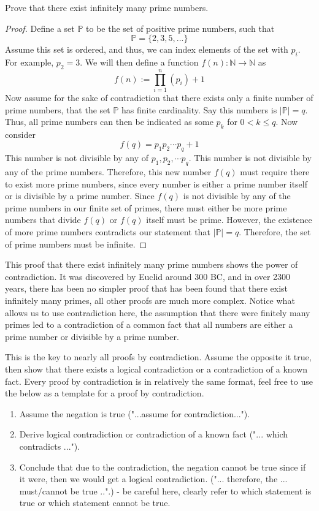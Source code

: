 \begin{example}
    Prove that there exist infinitely many prime numbers.
\end{example}
\begin{proof}
Define a set $\mathbb{P}$ to be the set of positive prime numbers, such that 
\[
\mathbb{P} = \{2, 3, 5, ... \}
\]
Assume this set is ordered, and thus, we can index elements of the set with $p_i$. For example, $p_2 = 3$. We will then define a function $f(n): \mathbb{N} \to \mathbb{N}$ as
\[
f(n) := \prod_{i=1}^{n}{(p_i)} + 1
\]
Now assume for the sake of contradiction that there exists only a finite number of prime numbers, that the set $\mathbb{P}$ has finite cardinality. Say this numbers is $|\mathbb{P}| = q$. Thus, all prime numbers can then be indicated as some $p_k$ for $0 < k \leq q$. Now consider
\[
f(q) = p_1p_2\cdots p_q + 1
\]
This number is not divisible by any of $p_1, p_2, \cdots p_q$. This number is not divisible by any of the prime numbers. Therefore, this new number $f(q)$ must require there to exist more prime numbers, since every number is either a prime number itself or is divisible by a prime number. Since $f(q)$ is not divisible by any of the prime numbers in our finite set of primes, there must either be more prime numbers that divide $f(q)$ or $f(q)$ itself must be prime. However, the existence of more prime numbers contradicts our statement that  $|\mathbb{P}| = q$. Therefore, the set of prime numbers must be infinite.
\end{proof}

This proof that there exist infinitely many prime numbers shows the power of contradiction. It was discovered by Euclid around 300 BC, and in over 2300 years, there has been no simpler proof that has been found that there exist infinitely many primes, all other proofs are much more complex. Notice what allows us to use contradiction here, the assumption that there were finitely many primes led to a contradiction of a common fact that all numbers are either a prime number or divisible by a prime number. 

This is the key to nearly all proofs by contradiction. Assume the opposite it true, then show that there exists a logical contradiction or a contradiction of a known fact. Every proof by contradiction is in relatively the same format, feel free to use the below as a template for a proof by contradiction. 
\begin{enumerate}
    \item Assume the negation is true ("...assume for contradiction...").
    \item Derive logical contradiction or contradiction of a known fact ("... which contradicts ...").
    \item Conclude that due to the contradiction, the negation cannot be true since if it were, then we would get a logical contradiction. ("... therefore, the ... must/cannot be true ..".) - be careful here, clearly refer to which statement is true or which statement cannot be true.
\end{enumerate}

